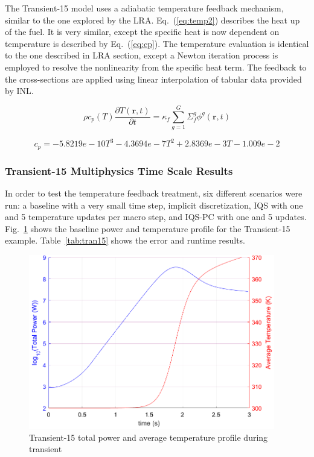 \documentclass{elsarticle}
\renewcommand{\vec}[1]{\bm{#1}} %
\newcommand{\eqt}[1]{Eq.~(\ref{#1})}                     %
\newcommand{\fig}[1]{Fig.~\ref{#1}}                      %
\newcommand{\tbl}[1]{Table~\ref{#1}}                     %
\newcommand{\iqspc}{IQS-PC\xspace}
\newcommand{\be}{\begin{equation}}
\newcommand{\ee}{\end{equation}}
\begin{document}
The Transient-15 model uses a adiabatic temperature feedback mechanism, similar to the one explored by the LRA. \eqt{eq:temp2} describes the heat up of the fuel.  It is very similar, except the specific heat is now dependent on temperature is described by \eqt{eq:cp}.  The temperature evaluation is identical to the one described in LRA section, except a Newton iteration process is employed to resolve the nonlinearity from the specific heat term.  The feedback to the cross-sections are applied using linear interpolation of tabular data provided by INL.

\be
\rho c_p(T) \frac{\partial T(\vec{r},t)}{\partial t} = \kappa_f \sum^G_{g=1}\Sigma_f^g \phi^g(\vec{r},t)
\label{eq:temp2}
\ee

\be
c_p = -5.8219e-10T^3 - 4.3694e-7T^2 + 2.8369e-3T -1.009e-2
\label{eq:cp}
\ee

\subsubsection{Transient-15 Multiphysics Time Scale Results}

In order to test the temperature feedback treatment, six different scenarios were run: a baseline with a very small time step, implicit discretization, IQS with one and 5 temperature updates per macro step, and \iqspc with one and 5 updates.  \fig{fig:Tran15_profile} shows the baseline power and temperature profile for the Transient-15 example.  \tbl{tab:tran15} shows the error and runtime results.

\begin{figure}[htbp!]
\centering
\includegraphics[height=3in]{figures/Tran15_profile.png}
\caption{Transient-15 total power and average temperature profile during transient}
\label{fig:Tran15_profile}
\end{figure}
\end{document}
